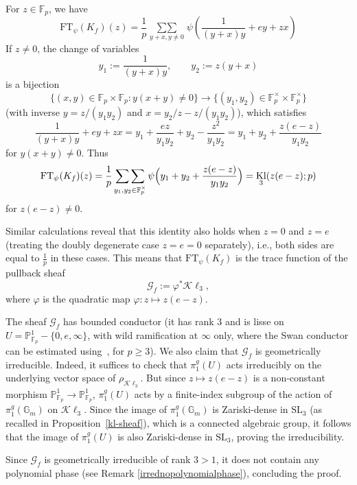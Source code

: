 \documentclass[12pt,a4paper,reqno]{amsart}
\numberwithin{equation}{section}
\newcommand{\FT}{\mathrm{FT}}
\DeclareMathOperator{\hypk}{Kl}
\newcommand{\Kl}{\mathcal{K}\ell}
\theoremstyle{plain}
\theoremstyle{definition}
\newcommand\F{\mathbb{F}}
\newcommand\mcG{\mathcal{G}}
\newcommand\mcK{\mathcal{K}}
\newcommand\Gm{\mathbb{G}_m}
\newcommand\Pl{\mathbb{P}^1}
\newcommand\Fp{\F_{p}}
\newcommand\Fpt{\F_{p}^{\times}}
\newcommand\sumsum{\mathop{\sum\sum}\limits}
\renewcommand{\phi}{\varphi}
\begin{document}
For $z\in \Fp$, we have
$$ 
\FT_\psi(K_f)(z) =\frac{1}{p} \sumsum_{y+x,y\neq 0}
\psi\left(\frac{1}{(y+x)y}+ ey + zx\right)
$$
If $z\neq 0$, the change of variables
$$
y_1:=\frac{1}{(y+x)y},\quad\quad y_2 := z(y+x)
$$ 
is a bijection
$$
\{(x,y)\in\Fp\times\Fp\colon y(x+y)\neq 0\}\to \{(y_1,y_2)\in
\Fpt\times\Fpt\}
$$
(with inverse $y=z/(y_1y_2)$ and $x=y_2/z-z/(y_1y_2)$), which
satisfies
$$
\frac{1}{(y+x)y}+ ey +
zx=y_1+\frac{ez}{y_1y_2}+y_2-\frac{z^2}{y_1y_2}=
y_1+y_2+\frac{z(e-z)}{y_1y_2}
$$
for $y(x+y)\neq 0$. Thus
$$
\FT_\psi(K_f)(z) =
\frac{1}{p}\sumsum_{y_1,y_2\in\Fpt}\psi\Bigl(
y_1+y_2+\frac{z(e-z)}{y_1y_2} \Bigr)=\hypk_3(z(e-z);p)
$$
for $z(e-z)\neq 0$.
\par
Similar calculations reveal that this identity also holds when $z=0$
and $z=e$ (treating the doubly degenerate case $z=e=0$ separately),
i.e., both sides are equal to $\frac{1}{p}$ in these cases. This means
that $\FT_\psi(K_f)$ is the trace function of the pullback sheaf
$$
\mcG_f := \phi^* \Kl_3,
$$
where $\phi$ is the quadratic map $\phi: z\mapsto z(e-z)$.

The sheaf $\mcG_f$ has bounded conductor (it has rank $3$ and is lisse on
$U=\Pl_{\Fp}-\{0,e,\infty\}$, with wild ramification at $\infty$ only,
where the Swan conductor can be estimated using~\cite[1.13.1]{GKM},
for $p\geq 3$).  We also claim that $\mcG_f$ is geometrically irreducible. Indeed, it suffices
to check that $\pi_1^g(U)$ acts irreducibly on the underlying vector
space of $\rho_{\Kl_3}$. But since $z\mapsto z(e-z)$ is a non-constant
morphism $\Pl_{\F_p} \to \Pl_{\F_p}$, $\pi_1^g(U)$ acts by a finite-index subgroup of
the action of $\pi_1^g(\Gm)$ on $\Kl_3$. Since the image of
$\pi_1^g(\Gm)$ is Zariski-dense in $\mathrm{SL}_3$ (as recalled in
Proposition~\ref{kl-sheaf}), which is a connected algebraic group, it
follows that the image of $\pi_1^g(U)$ is also Zariski-dense in
$\mathrm{SL}_3$, proving the irreducibility.
\par
Since $\mcG_f$ is geometrically irreducible of rank $3>1$, it does not
contain any polynomial phase (see Remark
\ref{irrednopolynomialphase}), concluding the proof.
\end{document}
